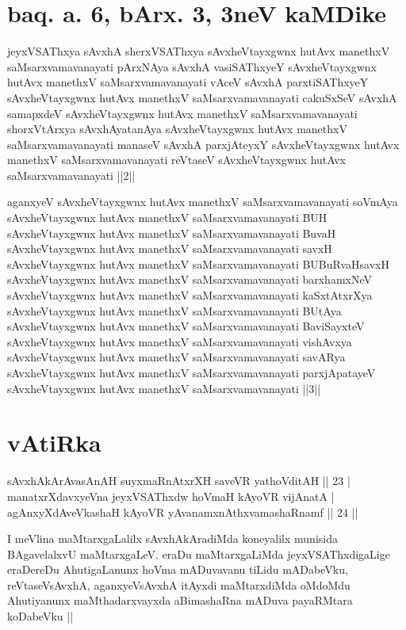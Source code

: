 \section{baq. a. 6, bArx. 3, 3neV kaMDike}

\begin{shl}
jeyxVSAThxya sAvxhA sherxVSAThxya sAvxheVtayxgwnx hutAvx manethxV saMsarxvamavanayati pArxNAya sAvxhA vasiSAThxyeY sAvxheVtayxgwnx hutAvx manethxV saMsarxvamavanayati vAceV sAvxhA parxtiSAThxyeY sAvxheVtayxgwnx hutAvx manethxV saMsarxvamavanayati cakuSxSeV sAvxhA samapxdeV sAvxheVtayxgwnx hutAvx manethxV saMsarxvamavanayati shorxVtArxya sAvxhAyatanAya sAvxheVtayxgwnx hutAvx manethxV saMsarxvamavanayati manaseV sAvxhA parxjAteyxY sAvxheVtayxgwnx hutAvx manethxV saMsarxvamavanayati reVtaseV sAvxheVtayxgwnx hutAvx saMsarxvamavanayati ||2||
\end{shl}

\begin{shl}
aganxyeV sAvxheVtayxgwnx hutAvx manethxV saMsarxvamavanayati soVmAya sAvxheVtayxgwnx hutAvx manethxV saMsarxvamavanayati BUH sAvxheVtayxgwnx hutAvx manethxV saMsarxvamavanayati BuvaH sAvxheVtayxgwnx hutAvx manethxV saMsarxvamavanayati savxH sAvxheVtayxgwnx hutAvx manethxV saMsarxvamavanayati BUBuRvaHsavxH sAvxheVtayxgwnx hutAvx manethxV saMsarxvamavanayati barxhamxNeV sAvxheVtayxgwnx hutAvx manethxV saMsarxvamavanayati kaSxtAtxrXya sAvxheVtayxgwnx hutAvx manethxV saMsarxvamavanayati BUtAya sAvxheVtayxgwnx hutAvx manethxV saMsarxvamavanayati BaviSayxteV sAvxheVtayxgwnx hutAvx manethxV saMsarxvamavanayati vishAvxya sAvxheVtayxgwnx hutAvx manethxV saMsarxvamavanayati savARya sAvxheVtayxgwnx hutAvx manethxV saMsarxvamavanayati parxjApatayeV sAvxheVtayxgwnx hutAvx manethxV saMsarxvamavanayati ||3||
\end{shl}

\section*{vAtiRka}

\begin{shl}
sAvxhAkArAvasAnAH suyxmaRnAtxrXH saveVR yathoVditAH \hfill|| 23 | \\
manatxrXdavxyeVna jeyxVSAThxdw hoVmaH kAyoVR vijAnatA | \\
agAnxyXdAveVkashaH kAyoVR yAvanamxnAthxvamashaRnamf \hfill|| 24 || 
\end{shl}

\begin{artha}
I meVlina maMtarxgaLalilx sAvxhAkAradiMda koneyalilx munisida BAgavelalxvU maMtarxgaLeV. eraDu maMtarxgaLiMda jeyxVSAThxdigaLige eraDereDu AhutigaLanunx hoVma mADuvavanu tiLidu mADabeVku, reVtaseVsAvxhA, aganxyeVsAvxhA itAyxdi maMtarxdiMda oMdoMdu Ahutiyanunx maMthadarxvayxda aBimashaRna mADuva payaRMtara koDabeVku ||
\end{artha}

